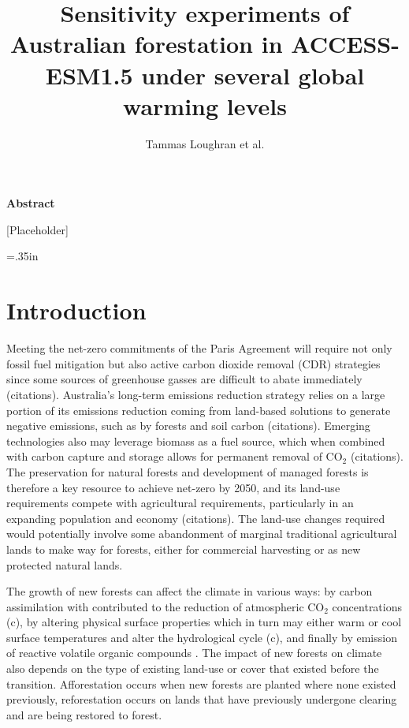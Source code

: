 \documentclass[]{article}
\title{Sensitivity experiments of Australian forestation in ACCESS-ESM1.5 under several global warming levels}
\author{Tammas Loughran et al.}
\begin{document}
\maketitle

\begin{center}
    \Large
    \vspace{0.9cm}
    \textbf{Abstract}
\end{center}

[Placeholder]

\raggedright
\parindent=.35in %

\section{Introduction}

Meeting the net-zero commitments of the Paris Agreement will require not only fossil fuel mitigation but also active carbon dioxide removal (CDR) strategies since some sources of greenhouse gasses are difficult to abate immediately (citations).
Australia's long-term emissions reduction strategy relies on a large portion of its emissions reduction coming from land-based solutions to generate negative emissions, such as by forests and soil carbon (citations).
Emerging technologies also may leverage biomass as a fuel source, which when combined with carbon capture and storage allows for permanent removal of CO$_2$ (citations).
The preservation for natural forests and development of managed forests is therefore a key resource to achieve net-zero by 2050, and its land-use requirements compete with agricultural requirements, particularly in an expanding population and economy (citations).
The land-use changes required would potentially involve some abandonment of marginal traditional agricultural lands to make way for forests, either for commercial harvesting or as new protected natural lands.

The growth of new forests can affect the climate in various ways: by carbon assimilation with contributed to the reduction of atmospheric CO$_2$ concentrations (c), by altering physical surface properties which in turn may either warm or cool surface temperatures and alter the hydrological cycle (c), and finally by emission of reactive volatile organic compounds \parencite{weber_chemistry_albedo_2024}. The impact of new forests on climate also depends on the type of existing land-use or cover that existed before the transition. Afforestation occurs when new forests are planted where none existed previously, reforestation occurs on lands that have previously undergone clearing and are being restored to forest.
\end{document}
